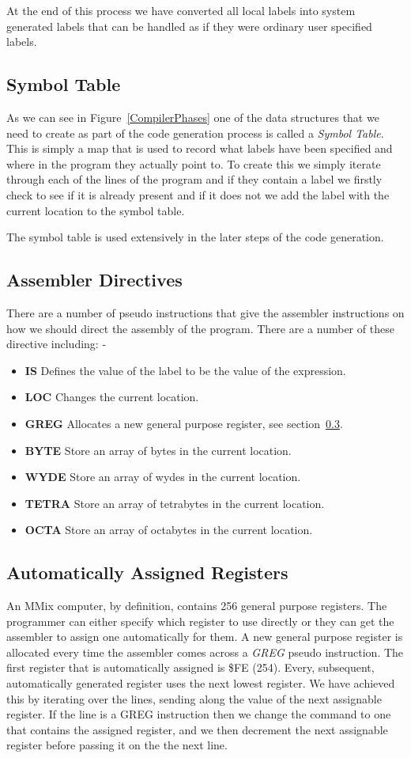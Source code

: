 \documentclass[a4paper,11pt]{report}
\begin{document}
At the end of this process we have converted all local labels into system generated labels that can be handled as if they were ordinary user specified labels.
\subsection{Symbol Table}
As we can see in Figure~\ref{CompilerPhases} one of the data structures that we need to create as part of the code generation process is called a \textit{Symbol Table}. This is simply a map that is used to record what labels have been specified and where in the program they actually point to. To create this we simply iterate through each of the lines of the program and if they contain a label we firstly check to see if it is already present and if it does not we add the label with the current location to the symbol table.

The symbol table is used extensively in the later steps of the code generation.
\subsection{Assembler Directives}
There are a number of pseudo instructions that give the assembler instructions on how we should direct the assembly of the program. There are a number of these directive including: -
\begin{itemize}
\item \textbf{IS} Defines the value of the label to be the value of the expression.
\item \textbf{LOC} Changes the current location.
\item \textbf{GREG} Allocates a new general purpose register, see section~\ref{greg}.
\item \textbf{BYTE} Store an array of bytes in the current location. 
\item \textbf{WYDE} Store an array of wydes in the current location.
\item \textbf{TETRA} Store an array of tetrabytes in the current location.
\item \textbf{OCTA} Store an array of octabytes in the current location.
\end{itemize}
\subsection{Automatically Assigned Registers}\label{greg}
An MMix computer, by definition, contains 256 general purpose registers. The programmer can either specify which register to use directly or they can get the assembler to assign one automatically for them. A new general purpose register is allocated every time the assembler comes across a \textit{GREG} pseudo instruction. The first register that is automatically assigned is \$FE (254). Every, subsequent, automatically generated register uses the next lowest register. We have achieved this by iterating over the lines, sending along the value of the next assignable register. If the line is a GREG instruction then we change the command to one that contains the assigned register, and we then decrement the next assignable register before passing it on the the next line.
\end{document}
